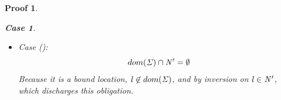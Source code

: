\documentclass[showabstract,showacknowledgments,showpreface,showdedication]{iuphd}
\newtheorem*{bcase}{Case}
\theoremstyle{nonumberplain}
\newtheorem{nproof}{Proof}
\begin{document}
\begin{nproof}
\begin{bcase}
\begin{itemize}
\begin{itemize}
\begin{itemize}
        \begin{align*}
          \indj > \allocptr{\reg}{\STOR}.
        \end{align*}
        Using the second and third conjuncts above, this case discharges immediately.
        \item Case ():
        This obligation discharges immediately because, by inversion on \tllafter{}, $\loc \in \NENV'$.
        \item Case ():
        The proof obligation is to establish that, for any constructor tag $\DC$,
        \begin{align*}
         ((\loc \mapsto \concreteloc{\reg}{\indj}{}) \in \MENV' \wedge \\
          (\reg \mapsto (\indj \mapsto \DC)) \not \in \STOR)
        \end{align*}
        The first conjunct discharges by inversion on \dletlocafter{},
        and the second as a consequence of having already
        established just above that $\indj > \allocptr{\reg}{\STOR}$.
        \item Case ():
        This case discharges straightforwardly, in a similar fashion
        to the previous case, for \dletloctag{}.
        \end{itemize}
      \item
      Case ():
      \begin{displaymath}
      dom(\mathit{\Sigma}) \cap \mathit{N}' = \emptyset
      \end{displaymath}
      Because it is a bound location, $\mathit{l} \not \in dom(\mathit{\Sigma})$, and by inversion on \tllafter{}
      $\loc \in \NENV'$, which discharges this obligation.      
      \end{itemize}
    \end{itemize}
  \end{bcase}


\end{nproof}
\end{document}
